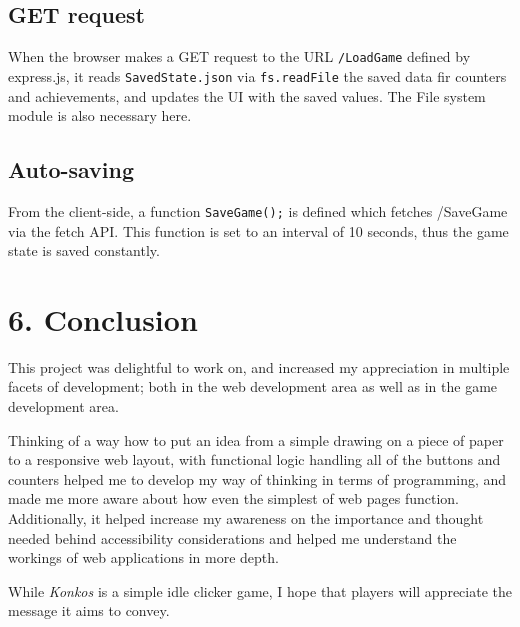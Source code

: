 \documentclass{article}
\begin{document}
\subsection*{GET request}
When the browser makes a GET request to the URL \texttt{/LoadGame} defined by express.js, it reads \texttt{SavedState.json} via \texttt{fs.readFile} the saved data fir counters and achievements, and updates the UI with the saved values. The File system module is also necessary here.

\subsection*{Auto-saving}
From the client-side, a function \texttt{SaveGame();} is defined which fetches /SaveGame via the fetch API. This function is set to an interval of 10 seconds, thus the game state is saved constantly.
\newpage
\section*{6. Conclusion}
This project was delightful to work on, and increased my appreciation in multiple facets of development; both in the web development area as well as in the game development area.

Thinking of a way how to put an idea from a simple drawing on a piece of paper to a responsive web layout, with functional logic handling all of the buttons and counters helped me to develop my way of thinking in terms of programming, and made me more aware about how even the simplest of web pages function. Additionally, it helped increase my awareness on the importance and thought needed behind accessibility considerations and helped me understand the workings of web applications in more depth.

While \textit{Konkos} is a simple idle clicker game, I hope that players will appreciate the message it aims to convey.
\end{document}
